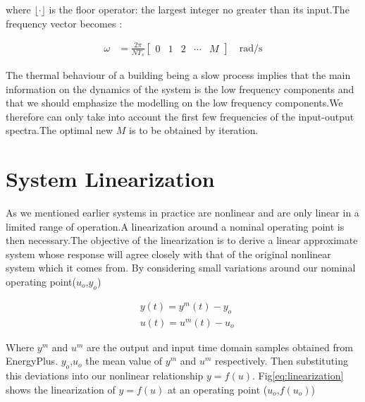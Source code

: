 \documentclass[a4paper,12pt]{report}
\numberwithin{equation}{section}
\begin{document}
\noindent
where $\lfloor\cdot\rfloor$ is the floor operator: the largest integer no greater than its input.The frequency vector becomes :

\begin{equation}
\begin{aligned}
\omega &=\frac{2 \pi}{N T_{s}}\left[\begin{array}{lllll}
0 & 1 & 2 & \cdots & M
\end{array}\right] \quad \mathrm{rad} / \mathrm{s}
\end{aligned}
\end{equation}

The thermal behaviour of a building being a slow process implies that the main information on the dynamics of the system is the low frequency components and that we should emphasize the modelling on the low frequency components.We therefore can only take into account the first few frequencies of the input-output spectra.The optimal new $M$ is to be obtained by iteration.

\section{System Linearization}
As we mentioned earlier systems in practice are nonlinear and are only linear in a limited range of operation.A linearization around a nominal operating point is then necessary.The objective of the linearization  is to derive a linear approximate system whose response will agree closely with that of the original nonlinear system which it comes from. By considering small variations around our nominal operating point($u_{o}$,$y_{o}$)

\begin{equation}
\begin{aligned}
&y(t)=y^{m}(t)-y_{o} \\
&u(t)=u^{m}(t)-u_{o}
\end{aligned}
\end{equation}

\noindent
Where $y^{m}$ and $u^{m}$ are the output and input time domain samples obtained from EnergyPlus. $y_{o}$,$u_{o}$ the mean value of $y^{m}$ and $u^{m}$ respectively. Then substituting this deviations into our nonlinear relationship $y=f(u)$. Fig\ref{eq:linearization} shows the linearization of $y=f(u)$ at an operating point ($u_{o}$,$f(u_{o})$)
\end{document}
